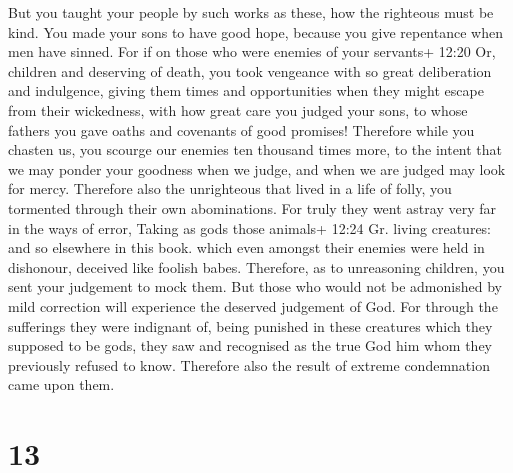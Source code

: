  But you taught your people by such works as these, how the
righteous must be kind. You made your sons to have good hope, because
you give repentance when men have sinned.  For if on those
who were enemies of your servants+ 12:20 Or, children and deserving of
death, you took vengeance with so great deliberation and indulgence,
giving them times and opportunities when they might escape from their
wickedness,  with how great care you judged your sons, to
whose fathers you gave oaths and covenants of good promises!
 Therefore while you chasten us, you scourge our enemies
ten thousand times more, to the intent that we may ponder your goodness
when we judge, and when we are judged may look for mercy. 
Therefore also the unrighteous that lived in a life of folly, you
tormented through their own abominations.  For truly they
went astray very far in the ways of error, Taking as gods those animals+
12:24 Gr. living creatures: and so elsewhere in this book. which even
amongst their enemies were held in dishonour, deceived like foolish
babes.  Therefore, as to unreasoning children, you sent
your judgement to mock them.  But those who would not be
admonished by mild correction will experience the deserved judgement of
God.  For through the sufferings they were indignant of,
being punished in these creatures which they supposed to be gods, they
saw and recognised as the true God him whom they previously refused to
know. Therefore also the result of extreme condemnation came upon them.

\hypertarget{section-12}{%
\section{13}\label{section-12}}

